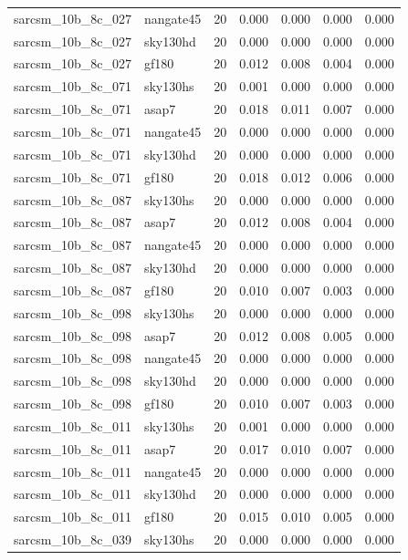 \begin{tabular}{llrrrrr}
sarcsm\_10b\_8c\_027 & nangate45 & 20 & 0.000 & 0.000 & 0.000 & 0.000 \\
sarcsm\_10b\_8c\_027 & sky130hd & 20 & 0.000 & 0.000 & 0.000 & 0.000 \\
sarcsm\_10b\_8c\_027 & gf180 & 20 & 0.012 & 0.008 & 0.004 & 0.000 \\
sarcsm\_10b\_8c\_071 & sky130hs & 20 & 0.001 & 0.000 & 0.000 & 0.000 \\
sarcsm\_10b\_8c\_071 & asap7 & 20 & 0.018 & 0.011 & 0.007 & 0.000 \\
sarcsm\_10b\_8c\_071 & nangate45 & 20 & 0.000 & 0.000 & 0.000 & 0.000 \\
sarcsm\_10b\_8c\_071 & sky130hd & 20 & 0.000 & 0.000 & 0.000 & 0.000 \\
sarcsm\_10b\_8c\_071 & gf180 & 20 & 0.018 & 0.012 & 0.006 & 0.000 \\
sarcsm\_10b\_8c\_087 & sky130hs & 20 & 0.000 & 0.000 & 0.000 & 0.000 \\
sarcsm\_10b\_8c\_087 & asap7 & 20 & 0.012 & 0.008 & 0.004 & 0.000 \\
sarcsm\_10b\_8c\_087 & nangate45 & 20 & 0.000 & 0.000 & 0.000 & 0.000 \\
sarcsm\_10b\_8c\_087 & sky130hd & 20 & 0.000 & 0.000 & 0.000 & 0.000 \\
sarcsm\_10b\_8c\_087 & gf180 & 20 & 0.010 & 0.007 & 0.003 & 0.000 \\
sarcsm\_10b\_8c\_098 & sky130hs & 20 & 0.000 & 0.000 & 0.000 & 0.000 \\
sarcsm\_10b\_8c\_098 & asap7 & 20 & 0.012 & 0.008 & 0.005 & 0.000 \\
sarcsm\_10b\_8c\_098 & nangate45 & 20 & 0.000 & 0.000 & 0.000 & 0.000 \\
sarcsm\_10b\_8c\_098 & sky130hd & 20 & 0.000 & 0.000 & 0.000 & 0.000 \\
sarcsm\_10b\_8c\_098 & gf180 & 20 & 0.010 & 0.007 & 0.003 & 0.000 \\
sarcsm\_10b\_8c\_011 & sky130hs & 20 & 0.001 & 0.000 & 0.000 & 0.000 \\
sarcsm\_10b\_8c\_011 & asap7 & 20 & 0.017 & 0.010 & 0.007 & 0.000 \\
sarcsm\_10b\_8c\_011 & nangate45 & 20 & 0.000 & 0.000 & 0.000 & 0.000 \\
sarcsm\_10b\_8c\_011 & sky130hd & 20 & 0.000 & 0.000 & 0.000 & 0.000 \\
sarcsm\_10b\_8c\_011 & gf180 & 20 & 0.015 & 0.010 & 0.005 & 0.000 \\
sarcsm\_10b\_8c\_039 & sky130hs & 20 & 0.000 & 0.000 & 0.000 & 0.000 \\

\end{tabular}
